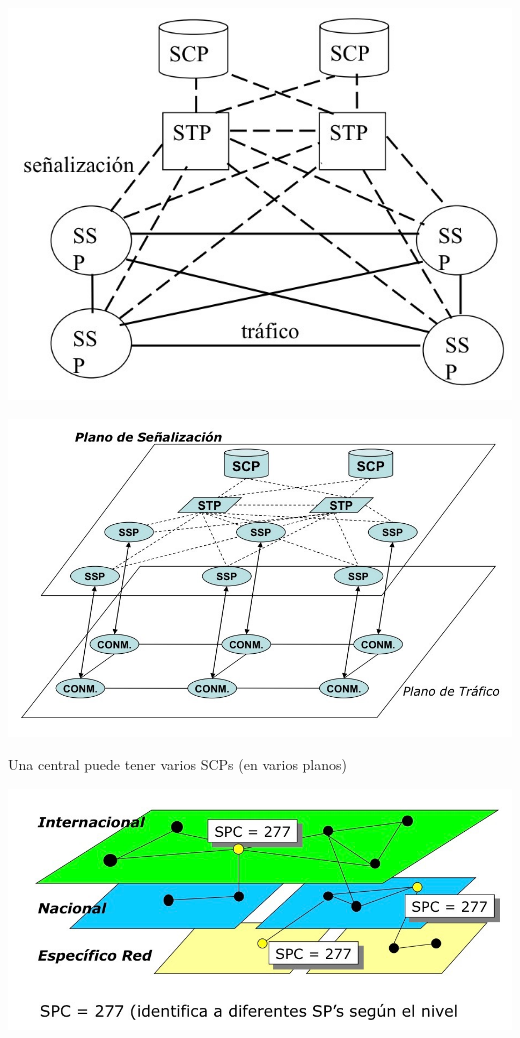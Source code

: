 \documentclass[10pt,portrait, twocolumn]{article}
\begin{document}
	\begin{center}
		\includegraphics[scale = 0.2]{RedSSP}
	\end{center}

	\begin{center}
		\includegraphics[scale = 0.2]{PlanoSS7}
	\end{center}

Una central puede tener varios SCPs (en varios planos)

	\begin{center}
		\includegraphics[scale = 0.2]{NivelesSS7}
	\end{center}

	





\end{document}
